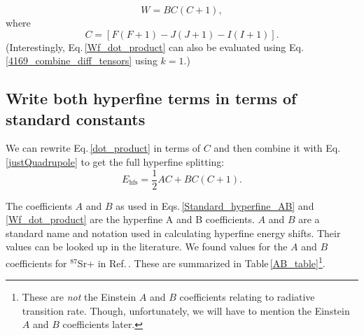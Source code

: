 \begin{equation}\label{justQuadrupole}
W=BC(C+1),
\end{equation}
where 
\begin{equation}
C=[F(F+1)-J(J+1)-I(I+1)].
\end{equation}
(Interestingly, Eq.\,\ref{Wf_dot_product} can also be evaluated using Eq.\,\ref{4169_combine_diff_tensors} using $k=1$.)

\subsection{Write both hyperfine terms in terms of standard constants}
We can rewrite Eq.\,\ref{dot_product} in terms of $C$ 
and then combine it with Eq.\,\ref{justQuadrupole} to get the full hyperfine splitting\cite{cuaMITnotes}: 
\begin{equation}\label{Standard_hyperfine_AB}
E_{\mathrm{hfs}}=\frac{1}{2}AC+BC(C+1).
\end{equation}

The coefficients $A$ and $B$ as used in Eqs.\,\ref{Standard_hyperfine_AB} and \ref{Wf_dot_product} are the hyperfine A and B coefficients. $A$ and $B$ are a standard name and notation used in calculating hyperfine energy shifts. Their values can be looked up in the literature\cite{cuaMITnotes}.  We found values for the $A$ and $B$ coefficients for $^{87}$Sr+ in Ref.\,\cite{safronova2photon}. These are summarized in Table\,\ref{AB_table}\footnote{These are \emph{not} the Einstein $A$ and $B$ coefficients relating to radiative transition rate. Though, unfortunately, we will have to mention the Einstein $A$ and $B$ coefficients later.}.  

